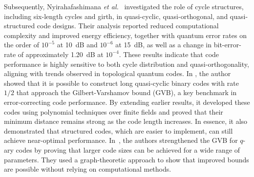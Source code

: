 \documentclass{iopjournal}
\theoremstyle{thmstyleone}%
\theoremstyle{thmstyletwo}%
\theoremstyle{thmstylethree}%
\begin{document}
\vspace{6pt}
Subsequently, Nyirahafashimana \emph{et al.}~\cite{Nyirahafashimana2025Exploring} investigated the role of cycle structures, including six-length cycles and girth, in quasi-cyclic, quasi-orthogonal, and quasi-structured code designs. Their analysis reported reduced computational complexity and improved energy efficiency, together with quantum error rates on the order of \(10^{-5}\) at 10~dB and \(10^{-6}\) at 15~dB, as well as a change in bit-error-rate of approximately 1.20~dB at \(10^{-4}\). These results indicate that code performance is highly sensitive to both cycle distribution and quasi-orthogonality, aligning with trends observed in topological quantum codes. In \cite{Kasami1974gilbert}, the author showed that it is possible to construct long quasi-cyclic binary codes with rate $1/2$ that approach the Gilbert-Varshamov bound (GVB), a key benchmark in error-correcting code performance. By extending earlier results, it developed these codes using polynomial techniques over finite fields and proved that their minimum distance remains strong as the code length increases. In essence, it also demonstrated that structured codes, which are easier to implement, can still achieve near-optimal performance. In~\cite{vu2005improving}, the authors strengthened the GVB for $q$-ary codes by proving that larger code sizes can be achieved for a wide range of parameters. They used a graph-theoretic approach to show that improved bounds are possible without relying on computational methods.
\end{document}
